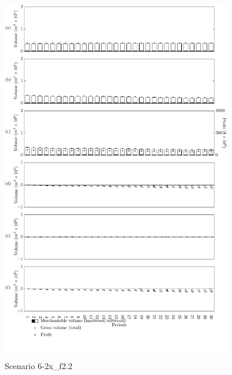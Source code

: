 \begin{figure}[h]
  \centering
  \includegraphics[width=10cm]{images/appendix/s6-2x_test20}
  \caption{Scenario 6-2x\_f2.2}
  \label{fig:s6-2x_test20}
\end{figure}

